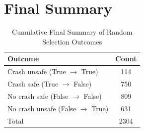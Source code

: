 \documentclass{article}
\begin{document}
\section{Final Summary}

\begin{table}[h]
\centering
\caption{Cumulative Final Summary of Random Selection Outcomes}
\begin{tabular}{lc}
\toprule
Outcome & Count \\
\midrule
Crash unsafe (True $\rightarrow$ True) & 114 \\ 
Crash safe (True $\rightarrow$ False) & 750 \\ 
No crash safe (False $\rightarrow$ False) & 809 \\ 
No crash unsafe (False $\rightarrow$ True) & 631 \\ 
\midrule
Total & 2304 \\ 
\bottomrule
\end{tabular}
\end{table}
\end{document}
